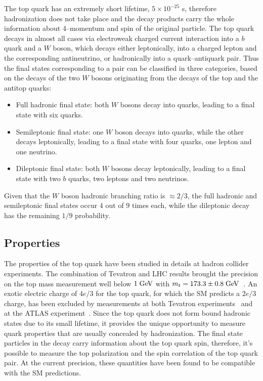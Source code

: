 The top quark has an extremely short lifetime, $5\times{}10^{-25}$
s, therefore hadronization does not take place and the decay products
carry the whole information about 4--momentum and spin of the original
particle.
The top quark decays in almost all cases via electroweak
charged current interaction into a $b$ quark and a $W$ boson, which
decays either leptonically, into a charged lepton and the corresponding
antineutrino, or hadronically into a quark--antiquark pair. Thus the
final states corresponding to a \ttbar{} pair can be classified in
three categories, based on the decays of the two $W$ bosons
originating from the decays of the top and the antitop quarks:
\begin{itemize}
\item Full hadronic final state: both $W$ bosons decay into quarks,
  leading to a \ttbar{} final state with six quarks.
\item Semileptonic final state: one $W$ boson decays into quarks,
  while the other decays leptonically, leading to a final state with
  four quarks, one lepton and one neutrino.
\item Dileptonic final state: both $W$ bosons decay leptonically,
  leading to a final state with two $b$ quarks, two leptons and two
  neutrinos. 
\end{itemize}
Given that the $W$ boson hadronic branching ratio is
$\approx{}2/3$, the full hadronic and semileptonic final states occur
$4$ out of $9$ times each, while the dileptonic decay has the
remaining $1/9$ probability.  

\subsection{Properties}
\label{sec:topdecay}

The properties of the top quark have been studied in details at hadron
collider experiments. The combination of Tevatron and LHC results
brought the precision on the top mass measurement well below $1 \; \mathrm{GeV}{}$
with $m_t=173.3\pm{}0.8 \; \mathrm{GeV}{}$~\cite{topmass}.
An exotic electric charge of $4e/3$ for the top quark, for which the
SM predicts a $2e/3$ charge, has been excluded by measurements at both
Tevatron experiments~\cite{Abazov:2006vd,Aaltonen:2010js} and at the
ATLAS experiment~\cite{Aad:2013uza}.
Since the top quark does not form bound hadronic states due to its
small lifetime, it provides the unique opportunity to measure quark
properties that are usually concealed by hadronization. The final state
particles in the decay carry information about the top quark spin,
therefore, it's possible to measure the top polarization and the spin
correlation of the top quark pair. At the current precision, these
quantities have been found to be compatible with the SM predictions.


